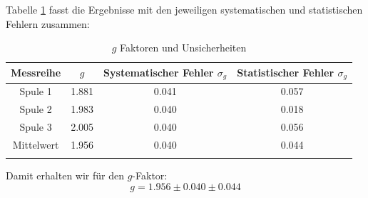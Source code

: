 \documentclass[a4paper,titlepage]{scrartcl}
\numberwithin{equation}{section}
\begin{document}
Tabelle \ref{tab:gs} fasst die Ergebnisse mit den jeweiligen systematischen und statistischen Fehlern zusammen:
\begin{longtable}[H]{cccc}
Messreihe & $g$ & Systematischer Fehler $\sigma_g$ & Statistischer Fehler $\sigma_g$ \\
\hline
Spule 1 & 1.881 & 0.041 & 0.057\\
Spule 2 & 1.983 & 0.040 & 0.018\\
Spule 3 & 2.005 & 0.040 & 0.056\\
\hline
Mittelwert & 1.956 & 0.040 & 0.044\\
\caption{$g$ Faktoren und Unsicherheiten}
\label{tab:gs}
\end{longtable}
Damit erhalten wir für den $g$-Faktor:
\begin{equation*}
\boxed{g=1.956 \pm 0.040 \pm 0.044}
\end{equation*}
\end{document}
